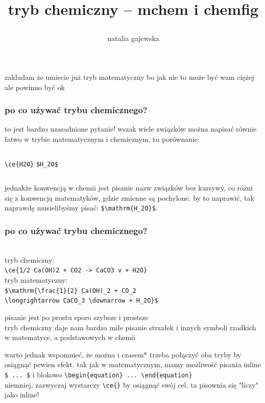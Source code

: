 \documentclass{beamer}
\title{\centerline{\color{Maroon}tryb chemiczny -- mchem i chemfig}}
\subtitle{\centerline{warsztaty \LaTeX \ 2025}}
\author{\centering natalia gajewska}
\date{}
\theoremstyle{newblock}
\begin{document}
\begin{frame}
    \maketitle
\end{frame}
\begin{frame}[standout]
    zakładam że umiecie już tryb matematyczny bo jak nie to może być wam ciężej ale powinno być ok
\end{frame}
\begin{frame}[fragile]
    \frametitle{po co używać trybu chemicznego?}
    to jest bardzo uzasadnione pytanie! wszak wiele związków można napisać równie łatwo w trybie matematycznym i chemicznym, tu porównanie:
    \vspace{5mm}
        \begin{columns}
        \verb|\ce{H2O}|         
        \verb|$H_2O$|
    \end{columns}
    \vspace{5mm}
    \pause jednakże konwencją w chemii jest pisanie nazw związków bez kursywy, co różni się z konwencją matematyków, gdzie zmienne są pochylone. by to naprawić, tak naprawdę musielibyśmy pisać: \verb|$\mathrm{H_2O}$|.
\end{frame}

\begin{frame}[fragile]
    \frametitle{po co używać trybu chemicznego?}
     \\
    \vspace{5mm}
    tryb chemiczny: \\    
    \verb|\ce{1/2 Ca(OH)2 + CO2 -> CaCO3 v + H2O}| \\
    \vspace{5mm} tryb matematyczny: \\
    \verb|$\mathrm{\frac{1}{2} Ca(OH)_2 + CO_2| \\ \verb|\longrightarrow CaCO_3 \downarrow + H_2O}$|
\end{frame}

\begin{frame}
    pisanie jest po prostu sporo szybsze i prostsze \\
    tryb chemiczny daje nam bardzo miłe pisanie strzałek i innych symboli rzadkich w matematyce, a podstawowych w chemii
\end{frame}

\begin{frame}[fragile]
    warto jednak wspomnieć, że można i czasem* trzeba połączyć oba tryby by osiągnąć pewien efekt. tak jak w matematycznym, mamy możliwość pisania inline \verb|$ ... $| i blokowo \verb|\begin{equation} ... \end{equation}| \\
    niemniej, zazwyczaj wystarczy \verb|\ce{}| by osiągnąć swój cel. ta pisownia się "liczy" jako inline!
\end{frame}
\end{document}
